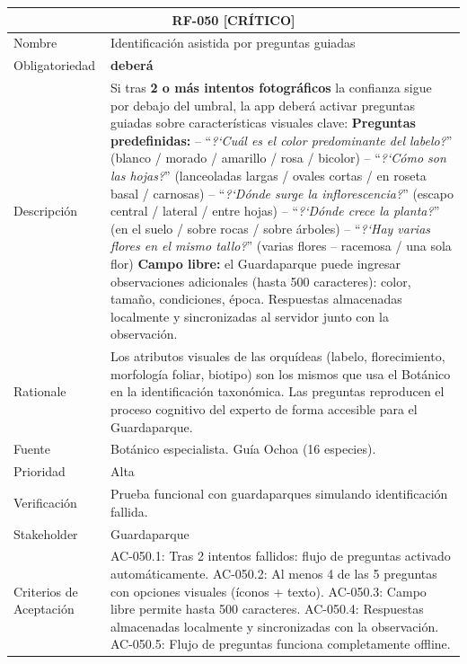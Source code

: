 \documentclass[12pt, a4paper]{article}
\newcommand{\criticomark}{\textcolor{criticolor}{\textbf{[CR\'ITICO]}}}
\begin{document}
\begin{longtable}{|p{3cm}|p{11.5cm}|}
\hline
\multicolumn{2}{|c|}{\textbf{RF-050} \criticomark} \\
\hline
Nombre & Identificaci\'on asistida por preguntas guiadas \\
\hline
Obligatoriedad & \textbf{deber\'a} \\
\hline
Descripci\'on & Si tras \textbf{2 o m\'as intentos fotogr\'aficos} la confianza sigue por debajo del umbral, la app deber\'a activar preguntas guiadas sobre caracter\'isticas visuales clave:\newline
\textbf{Preguntas predefinidas:}\newline
\quad -- ``\textit{?`Cu\'al es el color predominante del labelo?}'' (blanco / morado / amarillo / rosa / bicolor)\newline
\quad -- ``\textit{?`C\'omo son las hojas?}'' (lanceoladas largas / ovales cortas / en roseta basal / carnosas)\newline
\quad -- ``\textit{?`D\'onde surge la inflorescencia?}'' (escapo central / lateral / entre hojas)\newline
\quad -- ``\textit{?`D\'onde crece la planta?}'' (en el suelo / sobre rocas / sobre \'arboles)\newline
\quad -- ``\textit{?`Hay varias flores en el mismo tallo?}'' (varias flores -- racemosa / una sola flor)\newline
\textbf{Campo libre:} el Guardaparque puede ingresar observaciones adicionales (hasta 500 caracteres): color, tama\~no, condiciones, \'epoca.\newline
Respuestas almacenadas localmente y sincronizadas al servidor junto con la observaci\'on. \\
\hline
Rationale & Los atributos visuales de las orqu\'ideas (labelo, florecimiento, morfolog\'ia foliar, biotipo) son los mismos que usa el Bot\'anico en la identificaci\'on taxon\'omica. Las preguntas reproducen el proceso cognitivo del experto de forma accesible para el Guardaparque. \\
\hline
Fuente & Bot\'anico especialista. Gu\'ia Ochoa (16 especies). \\
\hline
Prioridad & Alta \\
\hline
Verificaci\'on & Prueba funcional con guardaparques simulando identificaci\'on fallida. \\
\hline
Stakeholder & Guardaparque \\
\hline
Criterios de Aceptaci\'on &
AC-050.1: Tras 2 intentos fallidos: flujo de preguntas activado autom\'aticamente. \newline
AC-050.2: Al menos 4 de las 5 preguntas con opciones visuales (\'iconos + texto). \newline
AC-050.3: Campo libre permite hasta 500 caracteres. \newline
AC-050.4: Respuestas almacenadas localmente y sincronizadas con la observaci\'on. \newline
AC-050.5: Flujo de preguntas funciona completamente offline. \\
\hline
\end{longtable}
\end{document}
